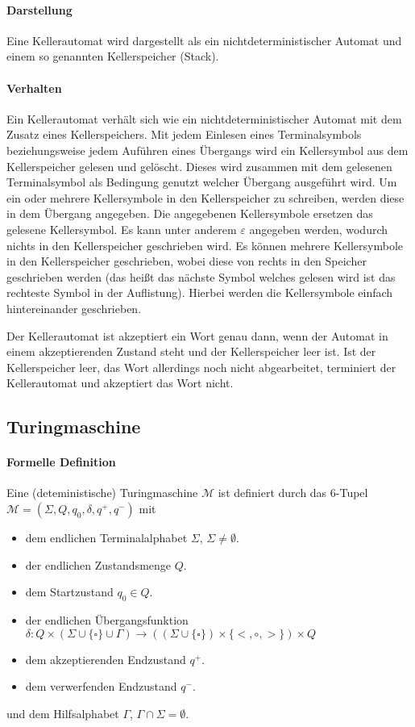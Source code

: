 		\paragraph{Darstellung}
			Eine Kellerautomat wird dargestellt als ein nichtdeterministischer Automat und einem so genannten Kellerspeicher (Stack).

		\paragraph{Verhalten}
			Ein Kellerautomat verhält sich wie ein nichtdeterministischer Automat mit dem Zusatz eines Kellerspeichers. Mit jedem Einlesen eines Terminalsymbols beziehungsweise jedem Auführen eines Übergangs wird ein Kellersymbol aus dem Kellerspeicher gelesen und gelöscht. Dieses wird zusammen mit dem gelesenen Terminalsymbol als Bedingung genutzt welcher Übergang ausgeführt wird. Um ein oder mehrere Kellersymbole in den Kellerspeicher zu schreiben, werden diese in dem Übergang angegeben. Die angegebenen Kellersymbole ersetzen das gelesene Kellersymbol. Es kann unter anderem $ \varepsilon $ angegeben werden, wodurch nichts in den Kellerspeicher geschrieben wird. Es können mehrere Kellersymbole in den Kellerspeicher geschrieben, wobei diese von rechts in den Speicher geschrieben werden (das heißt das nächste Symbol welches gelesen wird ist das rechteste Symbol in der Auflistung). Hierbei werden die Kellersymbole einfach hintereinander geschrieben.

			Der Kellerautomat ist akzeptiert ein Wort genau dann, wenn der Automat in einem akzeptierenden Zustand steht und der Kellerspeicher leer ist. Ist der Kellerspeicher leer, das Wort allerdings noch nicht abgearbeitet, terminiert der Kellerautomat und akzeptiert das Wort nicht.


	\subsection{Turingmaschine}
		\paragraph{Formelle Definition}
			Eine (deteministische) Turingmaschine $ \mathcal{M} $ ist definiert durch das 6-Tupel $ \mathcal{M} = (\Sigma, Q, q _ 0, \delta, q ^ +, q ^ -) $ mit
			\begin{itemize}
				\item dem endlichen Terminalalphabet $ \Sigma $, $ \Sigma \neq \emptyset $.
				\item der endlichen Zustandsmenge $ Q $.
				\item dem Startzustand $ q _ 0 \in Q $.
				\item der endlichen Übergangsfunktion $ \delta : Q \times (\Sigma \cup \{ \square \} \cup \Gamma) \rightarrow ((\Sigma \cup \{ \square \}) \times \{ <, \circ, > \}) \times Q $
				\item dem akzeptierenden Endzustand $ q ^ + $.
				\item dem verwerfenden Endzustand $ q ^ - $.
			\end{itemize}
			und dem Hilfsalphabet $ \Gamma $, $ \Gamma \cap \Sigma = \emptyset $.

